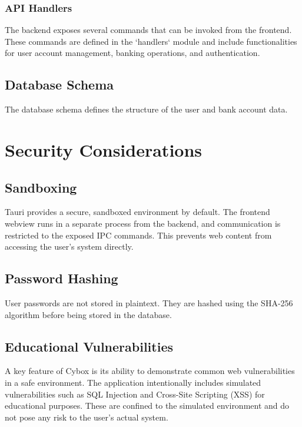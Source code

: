 \documentclass{report}
\begin{document}
\subsection{API Handlers}
The backend exposes several commands that can be invoked from the frontend. These commands are defined in the `handlers` module and include functionalities for user account management, banking operations, and authentication.



\section{Database Schema}
The database schema defines the structure of the user and bank account data.



\chapter{Security Considerations}

\section{Sandboxing}
Tauri provides a secure, sandboxed environment by default. The frontend webview runs in a separate process from the backend, and communication is restricted to the exposed IPC commands. This prevents web content from accessing the user's system directly.

\section{Password Hashing}
User passwords are not stored in plaintext. They are hashed using the SHA-256 algorithm before being stored in the database.



\section{Educational Vulnerabilities}
A key feature of Cybox is its ability to demonstrate common web vulnerabilities in a safe environment. The application intentionally includes simulated vulnerabilities such as SQL Injection and Cross-Site Scripting (XSS) for educational purposes. These are confined to the simulated environment and do not pose any risk to the user's actual system.
\end{document}
